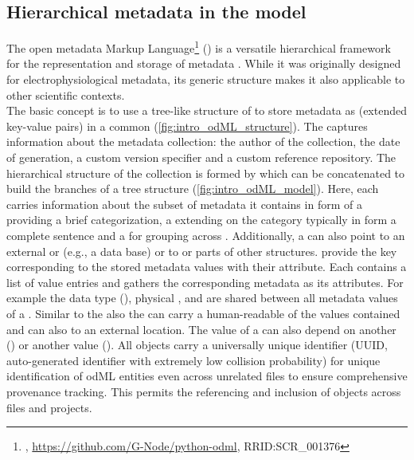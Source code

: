 \subsection{Hierarchical metadata in the  model}
\label{sec:odml}

The open metadata Markup Language\footnote{, \url{https://github.com/G-Node/python-odml}, RRID:SCR\_001376} () is a versatile hierarchical framework for the representation and storage of metadata \citep{Grewe_2011}. While it was originally designed for electrophysiological metadata, its generic structure makes it also applicable to other scientific contexts.\\

The basic concept is to use a tree-like structure of  to store metadata as  (extended key-value pairs) in a common  (\cref{fig:intro_odML_structure}). The  captures information about the metadata collection: the author of the collection, the date of generation, a custom version specifier and a custom reference repository. The hierarchical structure of the collection is formed by  which can be concatenated to build the branches of a tree structure (\cref{fig:intro_odML_model}). Here, each  carries information about the subset of metadata it contains in form of a   providing a brief categorization, a  extending on the category typically in form a complete sentence and a  for grouping across . Additionally, a  can also point to an external  or  (e.g., a data base) or  to or  parts of other  structures.  provide  the key corresponding to the stored metadata values with their  attribute. Each  contains a list of value entries and gathers the corresponding metadata as its  attributes. For example the data type (), physical ,  and  are shared between all metadata values of a . Similar to the  also the  can carry a human-readable  of the values contained and can also  to an external location. The value of a  can also depend on another  () or another  value (). All  objects carry a universally unique identifier (UUID, auto-generated identifier with extremely low collision probability) for unique identification of odML entities even across unrelated files to ensure comprehensive provenance tracking. This permits the referencing and inclusion of  objects across files and projects.\\

